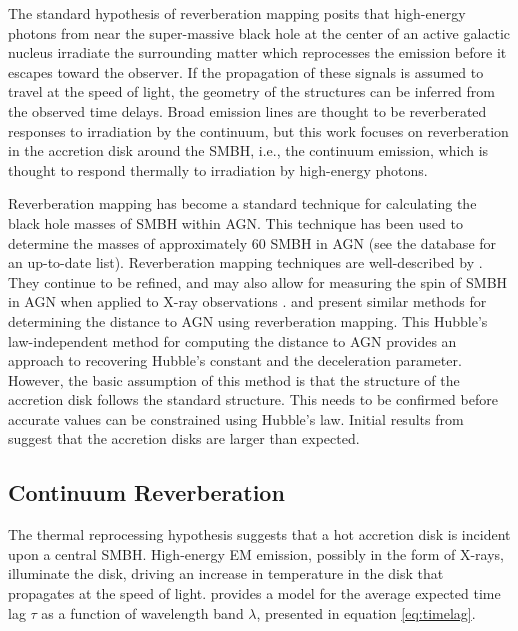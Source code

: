 \documentclass[11pt,letterpaper]{article}
\begin{document}
The standard hypothesis of reverberation mapping posits that high-energy photons from near the super-massive black hole at the center of an active galactic nucleus irradiate the surrounding matter which reprocesses the emission before it escapes toward the observer. If the propagation of these signals is assumed to travel at the speed of light, the geometry of the structures can be inferred from the observed time delays. Broad emission lines are thought to be reverberated responses to irradiation by the continuum, but this work focuses on reverberation in the accretion disk around the SMBH, i.e., the continuum emission, which is thought to respond thermally to irradiation by high-energy photons.

Reverberation mapping has become a standard technique for calculating the black hole masses of SMBH within AGN. This technique has been used to determine the masses of approximately 60 SMBH in AGN (see the \cite{2015PASP..127...67B} database for an up-to-date list). Reverberation mapping techniques are well-described by \cite{2014SSRv..183..253P}. They continue to be refined, and may also allow for measuring the spin of SMBH in AGN when applied to X-ray observations \citep{2016Natur.535..388K}. \cite{2007MNRAS.380..669C} and \cite{1999MNRAS.302L..24C} present similar methods for determining the distance to AGN using reverberation mapping. This Hubble's law-independent method for computing the distance to AGN provides an approach to recovering Hubble's constant and the deceleration parameter. However, the basic assumption of this method is that the structure of the accretion disk follows the standard \cite{1973A&A....24..337S} structure. This needs to be confirmed before accurate values can be constrained using Hubble's law. Initial results from \cite{2007MNRAS.380..669C} suggest that the accretion disks are larger than expected.

    \subsection{Continuum Reverberation}
    \label{sec:cont_reverb}
    
    The thermal reprocessing hypothesis suggests that a hot accretion disk is incident upon a central SMBH. High-energy EM emission, possibly in the form of X-rays, illuminate the disk, driving an increase in temperature in the disk that propagates at the speed of light. \cite{1999MNRAS.302L..24C} provides a model for the average expected time lag $\tau$ as a function of wavelength band $\lambda$, presented in equation \ref{eq:timelag}.
\end{document}
